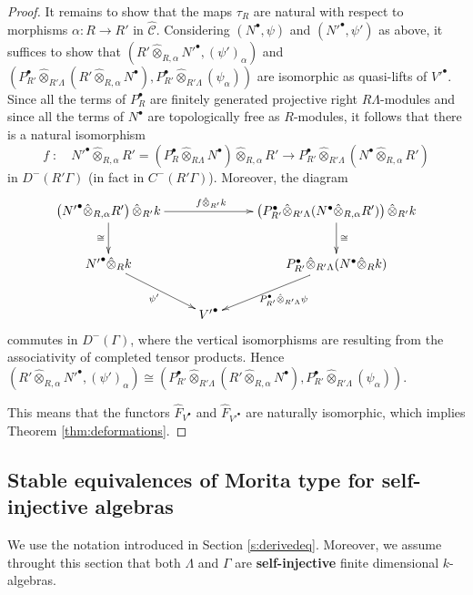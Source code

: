 \documentclass{amsart}
\theoremstyle{plain}
\theoremstyle{definition}
\theoremstyle{remark}
\begin{document}
\begin{proof}
It remains to show that the maps $\tau_R$ are natural with respect to morphisms $\alpha:R\to R'$ in 
$\hat{\mathcal{C}}$. Considering $(N^\bullet, \psi)$ and $({N'}^\bullet, \psi')$ as above, it suffices to
show that $(R'\hat{\otimes}_{R,\alpha}{N'}^\bullet,(\psi')_\alpha)$ and 
$(P_{R'}^\bullet \hat{\otimes}_{R'\Lambda} (R'\hat{\otimes}_{R,\alpha}N^\bullet),P_{R'}^\bullet \hat{\otimes}_{R'\Lambda}(\psi_\alpha))$ are isomorphic as quasi-lifts of ${V'}^\bullet$.
Since all the terms of $P_R^\bullet$ are finitely generated projective right $R\Lambda$-modules and
since all the terms of $N^\bullet$ are topologically free as $R$-modules, it follows
that there is a natural isomorphism
$$f\;:\quad {N'}^\bullet \hat{\otimes}_{R,\alpha}R'= 
(P_R^\bullet \hat{\otimes}_{R\Lambda}N^\bullet)\hat{\otimes}_{R,\alpha}R'
\to P_{R'}^\bullet \hat{\otimes}_{R'\Lambda}(N^\bullet\hat{\otimes}_{R,\alpha} R')$$
in $D^-(R'\Gamma)$ (in fact in $C^-(R'\Gamma)$). Moreover, the diagram
$$
\xymatrix{
\left({N'}^\bullet\hat{\otimes}_{R,\alpha}R'\right)\hat{\otimes}_{R'}k
\ar[rr]^(.45){f\hat{\otimes}_{R'}k} \ar[d]_{\cong}& &
\left(P_{R'}^\bullet \hat{\otimes}_{R'\Lambda}(N^\bullet\hat{\otimes}_{R,\alpha} R')\right)\hat{\otimes}_{R'}k
\ar[d]^{\cong}\\
{N'}^\bullet\hat{\otimes}_Rk\ar[rd]_{\psi'} && P_{R'}^\bullet \hat{\otimes}_{R'\Lambda}(N^\bullet\hat{\otimes}_R k)\ar[ld]^{P_{R'}^\bullet \hat{\otimes}_{R'\Lambda}\psi}
\\&{V'}^\bullet&
}$$
commutes in $D^-(\Gamma)$, where the vertical isomorphisms are resulting from the associativity of completed tensor products. Hence $(R'\hat{\otimes}_{R,\alpha}{N'}^\bullet,(\psi')_\alpha) \cong (P_{R'}^\bullet \hat{\otimes}_{R'\Lambda} (R'\hat{\otimes}_{R,\alpha}N^\bullet),P_{R'}^\bullet \hat{\otimes}_{R'\Lambda}(\psi_\alpha))$.

This means that the functors $\hat{F}_{V^\bullet}$ and $\hat{F}_{{V'}^\bullet}$ are naturally 
isomorphic, which implies Theorem \ref{thm:deformations}.
\end{proof}

\subsection{Stable equivalences of Morita type for self-injective algebras}
\label{s:stableeq}

We use the notation introduced in Section \ref{s:derivedeq}. Moreover, we assume throught this section
that both $\Lambda$ and $\Gamma$ are \textbf{self-injective} finite dimensional $k$-algebras.
\end{document}
